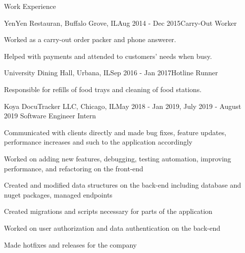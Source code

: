 \documentclass{resume}
\begin{document}
\begin{rSection}{Work Experience}

\begin{rSubsection}{YenYen Restauran, Buffalo Grove, IL}{Aug 2014 - Dec 2015}{Carry-Out Worker}{}

    \item Worked as a carry-out order packer and phone answerer.
    \item Helped with payments and attended to customers' needs when busy.

\end{rSubsection}

\begin{rSubsection}{University Dining Hall, Urbana, IL}{Sep 2016 - Jan 2017}{Hotline Runner}{}

    \item Responsible for refills of food trays and cleaning of food stations.

\end{rSubsection}

\begin{rSubsection}{Koya DocuTracker LLC, Chicago, IL}{May 2018 - Jan 2019, July 2019 - August 2019}
{Software Engineer Intern}

    \item Communicated with clients directly and made bug fixes, feature updates, performance increases and such to the application accordingly
    \item Worked on adding new features, debugging, testing automation, improving performance, and refactoring on the front-end
    \item Created and modified data structures on the back-end including database and nuget packages, managed endpoints
    \item Created migrations and scripts necessary for parts of the application
    \item Worked on user authorization and data authentication on the back-end
    \item Made hotfixes and releases for the company

\end{rSubsection}

\end{rSection}

\bigbreak
\end{document}
